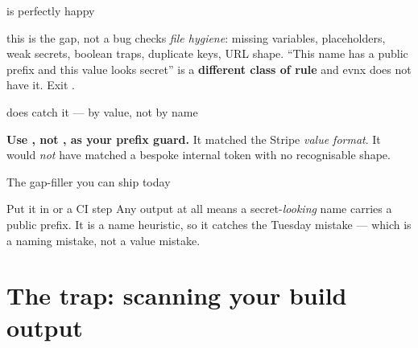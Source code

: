 \documentclass[aspectratio=169,10pt]{beamer}
\begin{document}
\begin{frame}[fragile]{ is perfectly happy}

  \vspace{0.4em}
  \begin{correction}{this is the gap, not a bug}
     checks \emph{file hygiene}: missing variables, placeholders,
    weak secrets, boolean traps, duplicate keys, URL shape. ``This name has a
    public prefix and this value looks secret'' is a \textbf{different class of
    rule} and evnx does not have it. Exit \exitzero.
  \end{correction}
\end{frame}

\begin{frame}[fragile]{ does catch it --- by value, not by name}

  \vspace{0.3em}
  {\footnotesize \textbf{Use , not , as your prefix
  guard.} It matched the Stripe \emph{value format}. It would \emph{not} have
  matched a bespoke internal token with no recognisable shape.}
\end{frame}

\begin{frame}[fragile]{The gap-filler you can ship today}

  \vspace{0.5em}
  \begin{block}{Put it in  or a CI step}
    Any output at all means a secret-\emph{looking} name carries a public
    prefix. It is a name heuristic, so it catches the Tuesday mistake ---
    which is a naming mistake, not a value mistake.
  \end{block}
\end{frame}

\section{The trap: scanning your build output}
\end{document}
